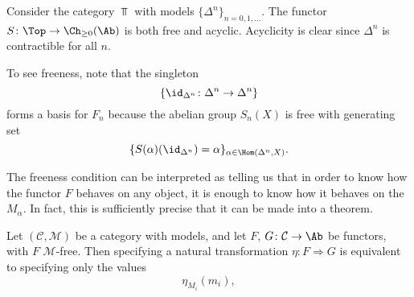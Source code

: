 \documentclass[main.tex]{subfiles}
\begin{document}
\begin{example}
  Consider the category $\Top$ with models $\{\Delta^{n}\}_{n = 0, 1, \ldots}$. The functor $S\colon \Top \to \Ch_{\geq 0}(\Ab)$ is both free and acyclic. Acyclicity is clear since $\Delta^{n}$ is contractible for all $n$.

  To see freeness, note that the singleton
  \begin{equation*}
    \{\id_{\Delta^{n}}\colon \Delta^{n} \to \Delta^{n}\}
  \end{equation*}
  forms a basis for $F_{n}$ because the abelian group $S_{n}(X)$ is free with generating set
  \begin{equation*}
    \{S(\alpha)(\id_{\Delta^{n}}) = \alpha\}_{\alpha \in \Hom(\Delta^{n}, X)}.
  \end{equation*}
\end{example}

The freeness condition can be interpreted as telling us that in order to know how the functor $F$ behaves on any object, it is enough to know how it behaves on the $M_{\alpha}$. In fact, this is sufficiently precise that it can be made into a theorem.

\begin{proposition}
  Let \((\mathcal{C}, \mathcal{M})\) be a category with models, and let \(F\), \(G\colon \mathcal{C} \to \Ab\) be functors, with \(F\) \(\mathcal{M}\)-free. Then specifying a natural transformation \(\eta\colon F \Rightarrow G\) is equivalent to specifying only the values
  \begin{equation*}
    \eta_{M_{i}}(m_{i}),
  \end{equation*}

\end{proposition}
\end{document}
